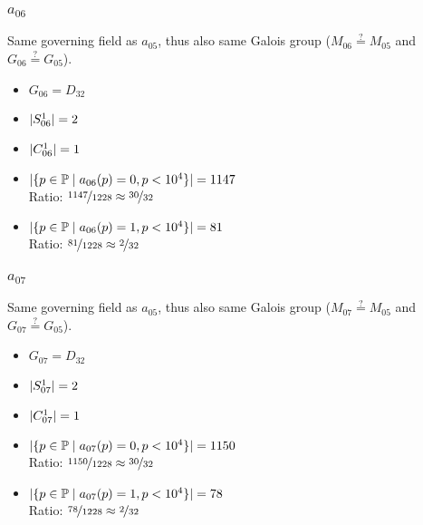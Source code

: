 \subsubsection{$a_{06}$}
Same governing field as $a_{05}$, thus also same Galois group ($M_{06} \stackrel{?}{=} M_{05}$ and $G_{06} \stackrel{?}{=} G_{05}$).
\begin{multicols}{2}
	\begin{itemize}
		\item $G_{06} = D_{32}$
		\item $| S_{06}^1 | = 2$
		\item $| C_{06}^1 | = 1$
	\end{itemize}
	\begin{itemize}
		\item $| \{ p \in \mathbb{P} \mid a_{06}(p)=0, p<10^4 \} | = 1147$\\
		Ratio: $\nicefrac{ 1147 }{ 1228 } \approx \nicefrac{ 30 }{ 32 }$
		\item $| \{ p \in \mathbb{P} \mid a_{06}(p)=1, p<10^4 \} | = 81$\\
		Ratio: $\nicefrac{ 81 }{ 1228 } \approx \nicefrac{ 2 }{ 32 }$
	\end{itemize}
\end{multicols}

\subsubsection{$a_{07}$}
Same governing field as $a_{05}$, thus also same Galois group ($M_{07} \stackrel{?}{=} M_{05}$ and $G_{07} \stackrel{?}{=} G_{05}$).
\begin{multicols}{2}
	\begin{itemize}
		\item $G_{07} = D_{32}$
		\item $| S_{07}^1 | = 2$
		\item $| C_{07}^1 | = 1$
	\end{itemize}
	\begin{itemize}
		\item $| \{ p \in \mathbb{P} \mid a_{07}(p)=0, p<10^4 \} | = 1150$\\
		Ratio: $\nicefrac{ 1150 }{ 1228 } \approx \nicefrac{ 30 }{ 32 }$
		\item $| \{ p \in \mathbb{P} \mid a_{07}(p)=1, p<10^4 \} | = 78$\\
		Ratio: $\nicefrac{ 78 }{ 1228 } \approx \nicefrac{ 2 }{ 32 }$
	\end{itemize}
\end{multicols}

